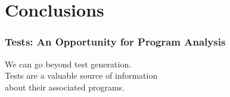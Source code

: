 \documentclass{beamer}
\begin{document}
\section{Conclusions}


\begin{frame}
  \frametitle{Tests: An Opportunity for Program Analysis}
\begin{center}
\Large
We can go beyond test generation.\\[1em]
Tests are a valuable source of information\\ about their associated programs.
\end{center}
\end{frame}
\end{document}
